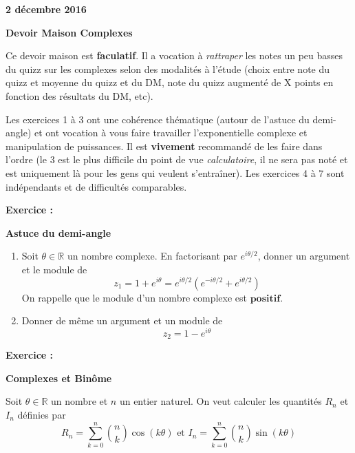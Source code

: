 \documentclass[a4paper,12pt]{article}\usepackage[]{graphicx}\usepackage[]{color}
\def\Exam{Devoir Maison \og Complexes \fg{}}
\def\Date{2 décembre 2016}
\begin{document}
\setcounter{nexo}{1}
\newcommand{\Exo}{\medskip
  {\bf Exercice \arabic{nexo} : }
  \addtocounter{nexo}{1}}
\newcommand{\Pb}{{\bf Problème \arabic{nexo} : } 
\addtocounter{nexo}{1} \bigskip}
{\bf  \hfill \Date \quad ~}
%
\vskip 1cm
%
\centerline{\bf \LARGE \Exam}
%
\vskip 1.5cm
%



Ce devoir maison est \textbf{faculatif}. Il a vocation à \emph{rattraper} les notes un peu basses du quizz sur les complexes selon des modalités à l'étude (choix entre note du quizz et moyenne du quizz et du DM, note du quizz augmenté de X points en fonction des résultats du DM, etc). 

Les exercices 1 à 3 ont une cohérence thématique (autour de l'astuce du demi-angle) et ont vocation à vous faire travailler l'exponentielle complexe et manipulation de puissances. Il est \textbf{vivement} recommandé de les faire dans l'ordre (le 3 est le plus difficile du point de vue \emph{calculatoire}, il ne sera pas noté et est uniquement là pour les gens qui veulent s'entraîner). Les exercices 4 à 7 sont indépendants et de difficultés comparables. 

\Exo \textbf{Astuce du demi-angle}

\begin{enumerate}
\item Soit $\theta \in \mathbb{R}$ un nombre complexe. En factorisant par $e^{i\theta/2}$, donner un argument et le module de 
$$z_1 = 1 + e^{i\theta} = e^{i\theta/2} (e^{-i\theta/2} + e^{i\theta/2})$$
On rappelle que le module d'un nombre complexe est $\textbf{positif}$.
\item Donner de même un argument et un module de 
$$z_2 = 1 - e^{i\theta}$$
\end{enumerate}

\Exo \textbf{Complexes et Binôme}

Soit $\theta \in \mathbb{R}$ un nombre et $n$ un entier naturel. On veut calculer les quantités $R_n$ et $I_n$ définies par 
\begin{equation*}
R_n  = \sum_{k=0}^n {n \choose k} \cos(k\theta) \text{ et } I_n  = \sum_{k=0}^n {n \choose k} \sin(k\theta)
\end{equation*}
\end{document}
